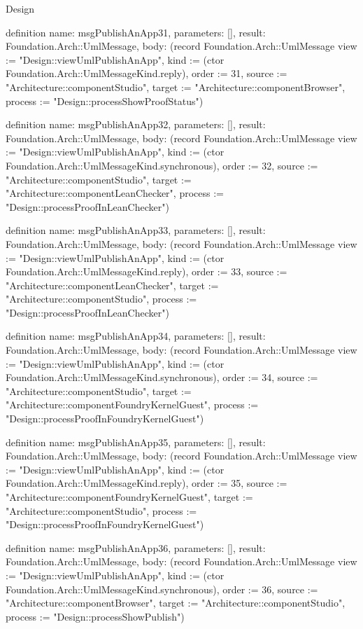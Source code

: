 \begin{lexlean}{Design}
\begin{semanticmodule}
definition{
  name: msgPublishAnApp31,
  parameters: [],
  result: Foundation.Arch::UmlMessage,
  body: (record Foundation.Arch::UmlMessage {view := "Design::viewUmlPublishAnApp", kind := (ctor Foundation.Arch::UmlMessageKind.reply), order := 31, source := "Architecture::componentStudio", target := "Architecture::componentBrowser", process := "Design::processShowProofStatus"})
}

definition{
  name: msgPublishAnApp32,
  parameters: [],
  result: Foundation.Arch::UmlMessage,
  body: (record Foundation.Arch::UmlMessage {view := "Design::viewUmlPublishAnApp", kind := (ctor Foundation.Arch::UmlMessageKind.synchronous), order := 32, source := "Architecture::componentStudio", target := "Architecture::componentLeanChecker", process := "Design::processProofInLeanChecker"})
}

definition{
  name: msgPublishAnApp33,
  parameters: [],
  result: Foundation.Arch::UmlMessage,
  body: (record Foundation.Arch::UmlMessage {view := "Design::viewUmlPublishAnApp", kind := (ctor Foundation.Arch::UmlMessageKind.reply), order := 33, source := "Architecture::componentLeanChecker", target := "Architecture::componentStudio", process := "Design::processProofInLeanChecker"})
}

definition{
  name: msgPublishAnApp34,
  parameters: [],
  result: Foundation.Arch::UmlMessage,
  body: (record Foundation.Arch::UmlMessage {view := "Design::viewUmlPublishAnApp", kind := (ctor Foundation.Arch::UmlMessageKind.synchronous), order := 34, source := "Architecture::componentStudio", target := "Architecture::componentFoundryKernelGuest", process := "Design::processProofInFoundryKernelGuest"})
}

definition{
  name: msgPublishAnApp35,
  parameters: [],
  result: Foundation.Arch::UmlMessage,
  body: (record Foundation.Arch::UmlMessage {view := "Design::viewUmlPublishAnApp", kind := (ctor Foundation.Arch::UmlMessageKind.reply), order := 35, source := "Architecture::componentFoundryKernelGuest", target := "Architecture::componentStudio", process := "Design::processProofInFoundryKernelGuest"})
}

definition{
  name: msgPublishAnApp36,
  parameters: [],
  result: Foundation.Arch::UmlMessage,
  body: (record Foundation.Arch::UmlMessage {view := "Design::viewUmlPublishAnApp", kind := (ctor Foundation.Arch::UmlMessageKind.synchronous), order := 36, source := "Architecture::componentBrowser", target := "Architecture::componentStudio", process := "Design::processShowPublish"})
}


\end{semanticmodule}
\end{lexlean}
